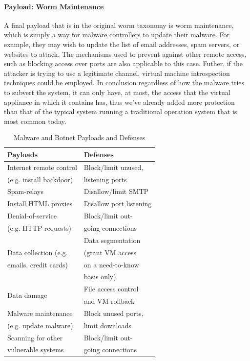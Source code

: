 \paragraph{Payload: Worm Maintenance}
A final payload that is in the original worm taxonomy is worm maintenance, which is simply a way for malware controllers to update their malware. For example, they may wish to update the list of email addresses, spam servers, or websites to attack. The mechanisms used to prevent against other remote access, such as blocking access over ports are also applicable to this case. Futher, if the attacker is trying to use a legitimate channel, virtual machine introspection techniques could be employed. In conclusion regardless of how the malware tries to subvert the system, it can only have, at most, the access that the virtual appliance in which it contains has, thus we've already added more protection than that of the typical system running a traditional operation system that is most common today. 

\begin{table}
\caption{Malware and Botnet Payloads and Defenses}
\begin{center}
\begin{tabular}{|l|l|}
\hline
\bf Payloads & \bf Defenses \\ \hline
Internet remote control & Block/limit unused, \\
(e.g. install backdoor) & listening ports \\ \hline
Spam-relays & Disallow/limit SMTP \\ \hline
Install HTML proxies & Disallow port listening \\ \hline
Denial-of-service & Block/limit out- \\
(e.g. HTTP requests) & going connections \\ \hline
& Data segmentation \\ %
Data collection (e.g. & (grant VM access   \\
emails, credit cards) & on a need-to-know \\
& basis only) \\ \hline
\multirow{2}{*}{Data damage} & File access control \\
& and VM rollback \\ \hline
Malware maintenance & Block unused ports, \\
(e.g. update malware) & limit downloads \\ \hline
Scanning for other & Block/limit out- \\
vulnerable systems & going connections \\ \hline
\end{tabular}
\end{center}
\end{table}

